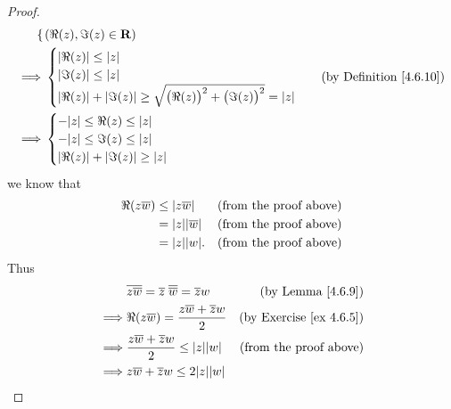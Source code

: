 \begin{proof}
\begin{align*}
\begin{cases}
                   \end{cases} & (\Re(z), \Im(z) \in \R) \\
        \implies & \begin{cases}
                       \abs{\Re(z)} \leq \abs{z} \\
                       \abs{\Im(z)} \leq \abs{z} \\
                       \abs{\Re(z)} + \abs{\Im(z)} \geq \sqrt{\big(\Re(z)\big)^2 + \big(\Im(z)\big)^2} = \abs{z}
                   \end{cases}                                                    & \text{(by Definition \ref{4.6.10})}                                        \\
        \implies & \begin{cases}
                       -\abs{z} \leq \Re(z) \leq \abs{z} \\
                       -\abs{z} \leq \Im(z) \leq \abs{z} \\
                       \abs{\Re(z)} + \abs{\Im(z)} \geq \abs{z}
                   \end{cases}
    \end{align*}
    we know that
    \begin{align*}
        \Re(z \overline{w}) & \leq \abs{z \overline{w}}    & \text{(from the proof above)} \\
                            & = \abs{z} \abs{\overline{w}} & \text{(from the proof above)} \\
                            & = \abs{z} \abs{w}.           & \text{(from the proof above)}
    \end{align*}
    Thus
    \begin{align*}
                 & \overline{z \overline{w}} = \overline{z} \; \overline{\overline{w}} = \overline{z} w                   & \text{(by Lemma \ref{4.6.9})}          \\
        \implies & \Re(z \overline{w}) = \frac{z \overline{w} + \overline{z} w}{2}                                        & \text{(by Exercise \ref{ex 4.6.5})}    \\
        \implies & \frac{z \overline{w} + \overline{z} w}{2} \leq \abs{z} \abs{w}                                         & \text{(from the proof above)}          \\
        \implies & z \overline{w} + \overline{z} w \leq 2 \abs{z} \abs{w}                                                                                          \\

\end{align*}
\end{proof}
